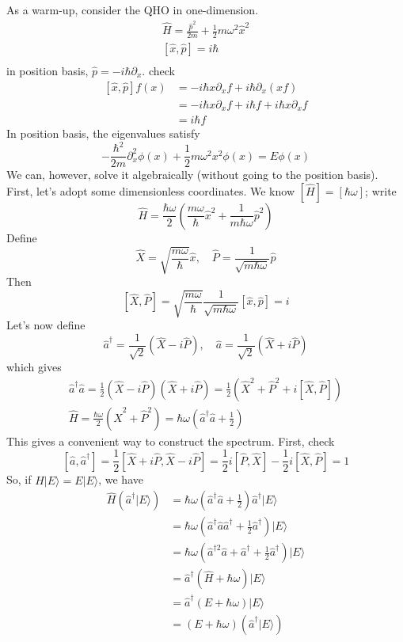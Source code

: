 As a warm-up, consider the QHO in one-dimension.
\begin{gather*}
    \hat{H}=\frac{\hat{p}^2}{2m}+\frac{1}{2}m\omega ^2\hat{x}^2 \\
    \left[ \hat{x},\hat{p} \right] =i\hbar \\
\end{gather*}
in position basis, $\hat{p}=-i\hbar \partial _x$. check
\begin{align*}
    \left[ \hat{x},\hat{p} \right] f\left( x \right) &=-i\hbar x\partial _xf+i\hbar \partial _x\left( xf \right) \\
    &=-i\hbar x\partial _xf+i\hbar f+i\hbar x\partial _xf\\
    &=i\hbar f
\end{align*}
In position basis, the eigenvalues satisfy
\[ -\frac{\hbar ^2}{2m}\partial _{x}^{2}\phi \left( x \right) +\frac{1}{2}m\omega ^2x^2\phi \left( x \right) =E\phi \left( x \right) \]
We can, however, solve it algebraically (without going to the position basis). First, let's adopt some dimensionless coordinates. We know $[\hat{H}]=[\hbar\omega]$; write
\[ \hat{H}=\frac{\hbar \omega}{2}\left( \frac{m\omega}{\hbar}\hat{x}^2+\frac{1}{m\hbar \omega}\hat{p}^2 \right) \]
Define
\[ \hat{X}=\sqrt{\frac{m\omega}{\hbar}}\hat{x},\quad \hat{P}=\frac{1}{\sqrt{m\hbar \omega}}\hat{p} \]
Then
\[ \left[ \hat{X},\hat{P} \right] =\sqrt{\frac{m\omega}{\hbar}}\frac{1}{\sqrt{m\hbar \omega}}\left[ \hat{x},\hat{p} \right] =i \]
Let's now define
\[ \hat{a}^{\dagger}=\frac{1}{\sqrt{2}}\left( \hat{X}-i\hat{P} \right) ,\quad \hat{a}=\frac{1}{\sqrt{2}}\left( \hat{X}+i\hat{P} \right) \]
which gives
\begin{gather*}
    \hat{a}^{\dagger}\hat{a}=\frac{1}{2}\left( \hat{X}-i\hat{P} \right) \left( \hat{X}+i\hat{P} \right) =\frac{1}{2}\left( \hat{X}^2+\hat{P}^2+i\left[ \hat{X},\hat{P} \right] \right) \\
    \hat{H}=\frac{\hbar \omega}{2}\left( \hat{X}^2+\hat{P}^2 \right) =\hbar \omega \left( \hat{a}^{\dagger}\hat{a}+\frac{1}{2} \right)
\end{gather*}
This gives a convenient way to construct the spectrum. First, check
\[ \left[ \hat{a},\hat{a}^{\dagger} \right] =\frac{1}{2}\left[ \hat{X}+i\hat{P},\hat{X}-i\hat{P} \right] =\frac{1}{2}i\left[ \hat{P},\hat{X} \right] -\frac{1}{2}i\left[ \hat{X},\hat{P} \right] =1 \]
So, if $\hat{H}|E\rangle =E|E\rangle$, we have
\begin{align*}
    \hat{H}\left( \hat{a}^{\dagger}|E\rangle \right) &=\hbar \omega \left( \hat{a}^{\dagger}\hat{a}+\frac{1}{2} \right) \hat{a}^{\dagger}|E\rangle \\
    &=\hbar \omega \left( \hat{a}^{\dagger}\hat{a}\hat{a}^{\dagger}+\frac{1}{2}\hat{a}^{\dagger} \right) |E\rangle \\
    &=\hbar \omega \left( \hat{a}^{\dagger 2}\hat{a}+\hat{a}^{\dagger}+\frac{1}{2}\hat{a}^{\dagger} \right) |E\rangle \\
    &=\hat{a}^{\dagger}\left( \hat{H}+\hbar \omega \right) |E\rangle \\
    &=\hat{a}^{\dagger}\left( E+\hbar \omega \right) |E\rangle \\
    &=\left( E+\hbar \omega \right) \left( \hat{a}^{\dagger}|E\rangle \right)
\end{align*}
